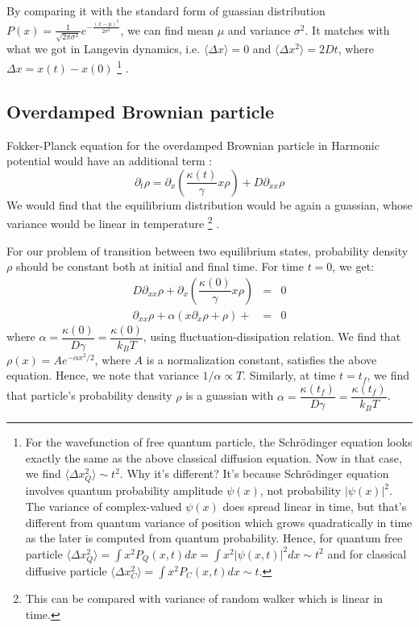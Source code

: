 \documentclass[11pt,a4paper]{article}
\begin{document}
By comparing it with the standard form of guassian distribution $P(x)= \frac{1}{\sqrt{2\pi\sigma^2} } e^{ -\frac{(x-\mu)^2}{2\sigma^2} }$,  we can find mean $\mu$ and variance $\sigma^2$. It matches with what we got in Langevin dynamics, i.e.  $\langle \Delta x\rangle=0$ and $\langle \Delta x ^2\rangle=2 Dt$, where $\Delta x= x(t)-x(0)$ \footnote{ For the wavefunction of free quantum particle, the Schr\"odinger equation looks exactly the same as the above classical diffusion equation. Now in that case, we find $\langle \Delta x_Q ^2\rangle \sim t^2$. Why it's different? It's because Schr\"odinger equation involves quantum probability amplitude $\psi(x)$, not probability $|\psi(x)|^2$. The variance of  complex-valued $\psi(x)$ does spread linear in time, but that's different from quantum variance of position which grows quadratically in time as the later is computed from quantum probability. Hence, for quantum free particle $\langle \Delta x_Q ^2\rangle = \int   x^2 P_Q(x,t) dx=  \int   x^2 |\psi(x,t)|^2 dx \sim t^2$ and for classical diffusive particle $\langle \Delta x_C ^2\rangle= \int   x^2 P_C(x,t) dx \sim t$. } .



\subsection*{Overdamped Brownian particle}
Fokker-Planck equation for the overdamped Brownian particle in Harmonic potential would have an additional term :
\begin{equation}
\partial_t \rho=  \partial_x \left( \dfrac{\kappa(t)}{\gamma} x \rho \right) + D \partial_{xx} \rho
\end{equation}
We would find that the equilibrium distribution would be again a guassian, whose variance would be linear in temperature \footnote{This can be compared with variance of random walker which is linear in time.} .

For our problem of transition between two equilibrium states, probability density $\rho$ should be constant both at initial and final time. For time $t=0$, we get:
\begin{eqnarray*}
 D \partial_{xx} \rho+  \partial_x \left( \dfrac{\kappa(0)}{\gamma} x \rho \right)  &=& 0 \\
  \partial_{xx} \rho + \alpha( x \partial_x   \rho +  \rho) +   &=& 0
\end{eqnarray*}
 where $\alpha = \dfrac{\kappa(0)}{D \gamma}= \dfrac{\kappa(0)}{k_B T}$, using fluctuation-dissipation relation.
We find that $\rho(x)= A e^{-\alpha x^2/2} $, where $A$ is a normalization constant, satisfies the above equation. Hence, we note that variance $1/\alpha \propto T$. Similarly, at time $t= t_f$, we find that particle's probability density $\rho$ is a guassian with $\alpha = \dfrac{\kappa(t_f)}{D \gamma}=\dfrac{\kappa(t_f)}{k_B T}$.
\end{document}
